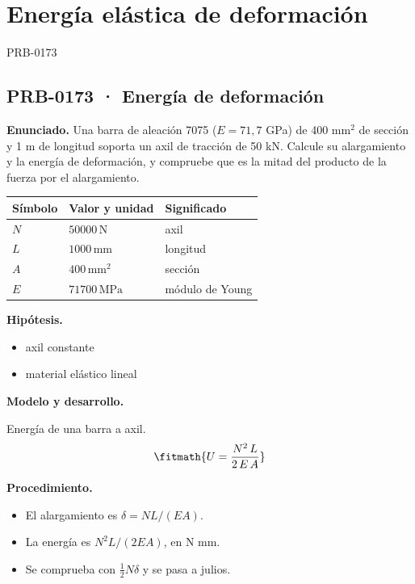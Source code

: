 \chapter{Energía elástica de deformación}


\Needspace{.3\textheight}

\begin{studiumworked}{PRB-0173}

\section{PRB-0173 · Energía de deformación}

\textbf{Enunciado.} Una barra de aleación 7075 ($E = 71{,}7$ GPa) de 400 mm$^2$ de sección y 1 m de longitud soporta un axil de tracción de 50 kN. Calcule su alargamiento y la energía de deformación, y compruebe que es la mitad del producto de la fuerza por el alargamiento.

\par\medskip\noindent\begin{tabular}{@{}p{.18\linewidth}p{.26\linewidth}p{.48\linewidth}@{}}
\toprule Símbolo & Valor y unidad & Significado\\\midrule
$N$ & $50000\,\mathrm{N}$ & axil\\
$L$ & $1000\,\mathrm{mm}$ & longitud\\
$A$ & $400\,\mathrm{mm^2}$ & sección\\
$E$ & $71700\,\mathrm{MPa}$ & módulo de Young\\
\bottomrule\end{tabular}\par\medskip

\textbf{Hipótesis.}\begin{itemize}\item axil constante
\item material elástico lineal\end{itemize}

\textbf{Modelo y desarrollo.}

Energía de una barra a axil.\[\fitmath{U = \frac{N^{2}\,L}{2\,E\,A}}\]

\textbf{Procedimiento.}\begin{itemize}\item El alargamiento es $\delta = N L/(E A)$.
\item La energía es $N^2 L/(2 E A)$, en N mm.
\item Se comprueba con $\tfrac12 N\delta$ y se pasa a julios.\end{itemize}


\end{studiumworked}
